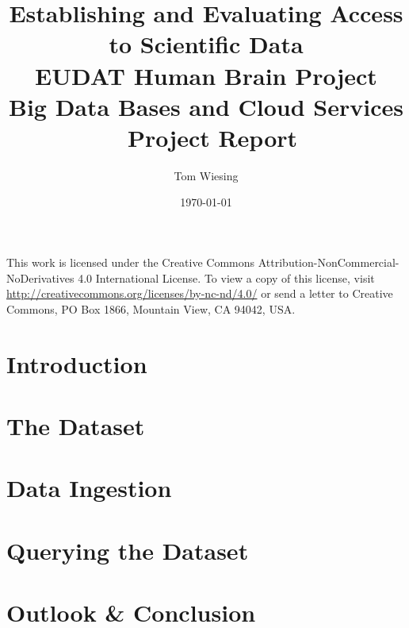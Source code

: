 \documentclass{article}
\title{Establishing and Evaluating Access to Scientific Data \\EUDAT Human Brain Project \\ Big Data Bases and Cloud Services \\ Project Report}
\author{Tom Wiesing}
\date{\today}
\begin{document}
	
	\maketitle
	

	\newpage
	
	\tableofcontents
	
	
	\vspace{\fill}\noindent	
	This work is licensed under the Creative Commons Attribution-NonCommercial-NoDerivatives 4.0 International License. To view a copy of this license, visit \url{http://creativecommons.org/licenses/by-nc-nd/4.0/} or send a letter to Creative Commons, PO Box 1866, Mountain View, CA 94042, USA. 
	\newpage
	
	\section{Introduction}
	
	\newpage
	
	\section{The Dataset}
	
	\newpage
	
	\section{Data Ingestion}
	
	\newpage
	
	\section{Querying the Dataset}
	
		
	\section{Outlook \& Conclusion}
	
	
	\printbibliography
\end{document}
